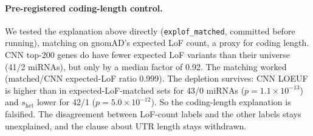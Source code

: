 \paragraph{Pre-registered coding-length control.} We tested the explanation above directly (\texttt{explof\_matched}, committed before running), matching on gnomAD's expected LoF count, a proxy for coding length. CNN top-200 genes do have fewer expected LoF variants than their universe (41/2 miRNAs), but only by a median factor of 0.92. The matching worked (matched/CNN expected-LoF ratio 0.999). The depletion survives: CNN LOEUF is higher than in expected-LoF-matched sets for 43/0 miRNAs ($p=1.1\times10^{-13}$) and $s_\mathrm{het}$ lower for 42/1 ($p=5.0\times10^{-12}$). So the coding-length explanation is falsified. The disagreement between LoF-count labels and the other labels stays unexplained, and the clause about UTR length stays withdrawn.
